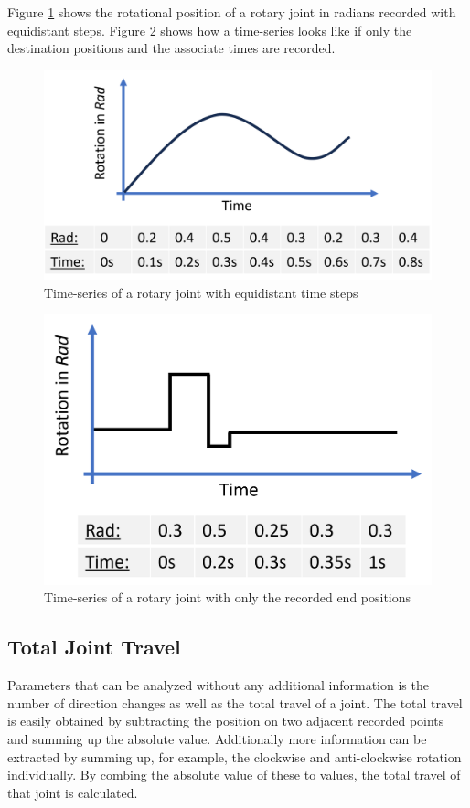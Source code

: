 Figure \ref{equi} shows the rotational position of a rotary joint in radians recorded with equidistant steps. Figure \ref{onchange} shows how a time-series looks like if only the destination positions and the associate times are recorded.

\begin{figure}[H]
	\centerline{\includegraphics[scale=.6]{figures/equi.png}}
	\caption{Time-series of a rotary joint with equidistant time steps}
	\label{equi}
\end{figure}

\begin{figure}[H]
	\centerline{\includegraphics[scale=.6]{figures/onchange.png}}
	\caption{Time-series of a rotary joint with only the recorded end positions}
	\label{onchange}
\end{figure}

\subsection{Total Joint Travel}
Parameters that can be analyzed without any additional information is the number of direction changes as well as the total travel of a joint. The total travel is easily obtained by subtracting the position on two adjacent recorded points and summing up the absolute value. Additionally more information can be extracted by summing up, for example, the clockwise and anti-clockwise rotation individually. By combing the absolute value of these to values, the total travel of that joint is calculated.

